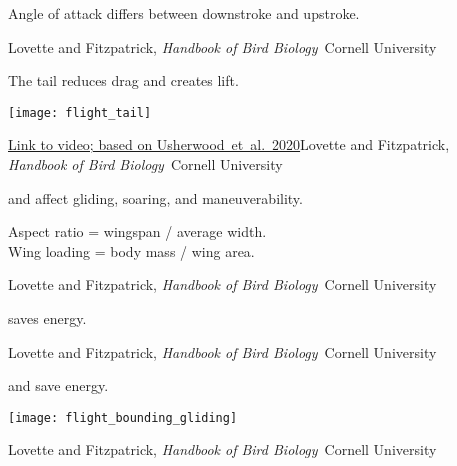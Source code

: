 \documentclass[t]{beamer}
\begin{document}
%
{
\begin{frame}[t,plain]{Angle of attack differs between downstroke and upstroke.}

\vfilll

\tiny \hfill Lovette and Fitzpatrick, \textit{Handbook of Bird Biology} \textcopyright\,Cornell University

\end{frame}
}
%
\begin{frame}[t,plain]{The tail reduces drag and creates lift.}

\vspace{-0.5\baselineskip}

\centering

\texttt{[image: flight\_tail]}

\vfilll

\tiny \href{https://youtu.be/2sh8_3-R90I}{Link to video; based on Usherwood~et~al.~2020}\hfill Lovette and Fitzpatrick, \textit{Handbook of Bird Biology} \textcopyright\,Cornell University

\end{frame}
%
{
\begin{frame}[t,plain]{ and  affect gliding, soaring, and maneuverability.}

\vspace{11\baselineskip}

\quad Aspect ratio = wingspan / average width. \\
\quad Wing loading = body mass / wing area.

\vfilll

\tiny \hfill Lovette and Fitzpatrick, \textit{Handbook of Bird Biology} \textcopyright\,Cornell University

\end{frame}
}
%
{
\begin{frame}[t,plain]{ saves energy.}

\vfilll

\tiny \hfill Lovette and Fitzpatrick, \textit{Handbook of Bird Biology} \textcopyright\,Cornell University

\end{frame}
}
%
\begin{frame}[t,plain]{ and  save energy.}

\vspace{-0.5\baselineskip}

\centering

\texttt{[image: flight\_bounding\_gliding]}

\vfilll

\tiny \hfill Lovette and Fitzpatrick, \textit{Handbook of Bird Biology} \textcopyright\,Cornell University

\end{frame}
\end{document}
